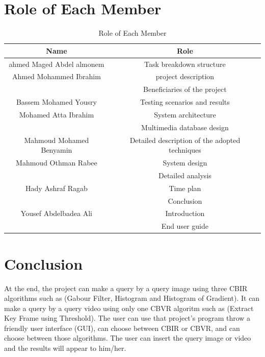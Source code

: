 \documentclass[pdftex,10pt,a4paper,oneside]{article}
\begin{document}
\section{Role of Each Member}
\begin{table}[H]
	\centering
	\begin{tabular}{||c| c ||} 
		\hline
		Name&Role\\[0.5ex] 
		\hline\hline
		ahmed Maged Abdel almonem& Task breakdown structure
		\\
		\hline
		Ahmed Mohammed Ibrahim& project description\\
		               &Beneficiaries of the project\\
		
		\hline
		 Bassem Mohamed Yousry&Testing scenarios and results\\
		 \hline
		 Mohamed Atta Ibrahim&System architecture \\
		                     &Multimedia database design \\
		 \hline
		 Mahmoud Mohamed Benyamin&Detailed description of the adopted techniques
		 \\
		 \hline
		 Mahmoud Othman Rabee & System design
		 \\
		 &Detailed analysis\\
		 
		 \hline
		  Hady Ashraf Ragab&Time plan\\
		                   &Conclusion
		                   \\
		  \hline
		  Yousef Abdelbadea Ali&Introduction\\
		  &End user guide
		  \\[1ex]
			\hline
	\end{tabular}
	\caption{Role of Each Member}
	\label{Role of Each Member}
\end{table}
	\pagebreak
	\section{Conclusion}
	
	At the end, the project can make a query by a query image using three CBIR algorithms such as (Gabour Filter, Histogram and Histogram of Gradient). It can make a query by a query video using only one CBVR algoritm such as (Extract Key Frame using Threshold). The user can use that project's program throw a friendly user interface (GUI), can choose between CBIR or CBVR, and can choose between those algorithms. The user can insert the query image or video and the results will appear to him/her.

	

	\pagebreak	
%	 
%	
	
	
	\printglossary
\end{document}
